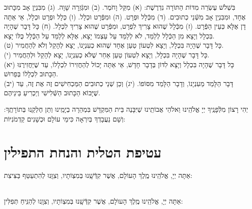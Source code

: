 \documentclass[twoside, openany, parskip=half, 11pt]{book}
\begin{document}
\clearpage


 
בִּשְׁלֹשׁ עֶשְׂרֵה מִדּוֹת הַתּוֹרָה נִדְרֶשֶׁת:\hfill \break
(א) מִקַּל וָחֹמֶר.\hfill \break
(ב) וּמִגְּֿזֵרָה שָׁוָה.\hfill \break
(ג) מִבִּנְיַן אָב מִכָּתוּב אֶחָד, וּמִבִּנְיַן אָב מִשְּֿׁנֵי כְתוּבִים.\hfill \break
(ד) מִכְּֿלָל וּפְרָט.\hfill \break
(ה) וּמִפְּֿרָט וּכְלָל.\hfill \break
(ו) כְּלָל וּפְרָט וּכְלָל, אֵי אַתָּה דָן אֶלָּא כְּעֵין הַפְּֿרָט.\hfill \break
(ז) מִכְּֿלָל שֶׁהוּא צָרִיךְ לִפְרָט, וּמִפְּֿרָט שֶׁהוּא צָרִיךְ לִכְלָל.\hfill \break
(ח) כָּל דָּבָר שֶׁהָיָה בִּכְלָל וְיָצָא מִן הַכְּֿלָל לְלַמֵּד, לֹא לְלַמֵּד עַל עַצְמוֹ יָצָא, אֶלָּא לְלַמֵּד עַל הַכְּֿלָל כֻּלּוֹ יָצָא. \\
(ט) כָּל דָּבָר שֶׁהָיָה בִּכְלָל, וְיָצָא לִטְעוֹן טַעַן אֶחָד שֶׁהוּא כְעִנְיָנוֹ, יָצָא לְהָקֵל וְלֹא לְהַחֲמִיר. \\
(י) כָּל דָּבָר שֶׁהָיָה בִּכְלָל, וְיָצָא לִטְעוֹן טַעַן אַחֵר שֶׁלֹּא כְעִנְיָנוֹ, יָצָא לְהָקֵל וּלְהַחֲמִיר. \\
(יא) כָּל דָּבָר שֶׁהָיָה בִּכְלָל וְיָצָא לִדּוֹן בְּדָבָר חָדָשׁ, אֵי אַתָּה יָכוֹל לְהַחֲזִירוֹ לִכְלָלוֹ, עַד שֶׁיַּחֲזִירֶנּוּ הַכָּתוּב לִכְלָלוֹ בְּפֵרוּשׁ. \\
(יב) דָּבָר הַלָּמֵד מֵעִנְיָנוֹ, וְדָבָר הַלָּמֵד מִסּוֹפוֹ.\hfill \break
(יג) וְכֵן שְׁנֵי כְתוּבִים הַמַּכְחִישִׁים זֶה אֶת זֶה, עַד שֶׁיָּבוֹא הַכָּתוּב הַשְּֿׁלִישִׁי וְיַכְרִיעַ בֵּינֵיהֶם. 

יְהִי רָצוֹן מִלְּֿפָנֶֽיךָ יְיָ אֱלֹהֵֽינוּ וֵאלֹהֵי אֲבוֹתֵֽינוּ שֶׁיִּבָּנֶה בֵּית הַמִּקְדָּשׁ בִּמְהֵרָה בְיָמֵֽינוּ וְתֵן חֶלְקֵֽנוּ בְּתוֹרָתֶֽךָ: וְשָׁם נַעֲבָדְךָ בְּיִרְאָה כִּימֵי עוֹלָם וּכְשָׁנִים קַדְמֹנִיּוֹת:

\clearpage

\section[עטיפת הטלית והנחת התפילין]{ עטיפת הטלית והנחת התפילין }

 אַתָּה יְיָ, אֱלֹהֵֽינוּ מֶֽלֶךְ הָעוֹלָם, אֲשֶׁר קִדְּֿשָֽׁנוּ בְּמִצְוֹתָיו, וְצִוָּֽנוּ לְהִתְעַטֵּף בַּצִּיצִת:


\sepline

\\
 אַתָּה יְיָ, אֱלֹהֵֽינוּ מֶֽלֶךְ הָעוֺלָם, אֲשֶׁר קִדְּֿשָֽׁנוּ בְּמִצְוֹתָיו, וְצִוָֽנוּ לְהַנִּֽיחַ תְּפִלִּין:
\end{document}
